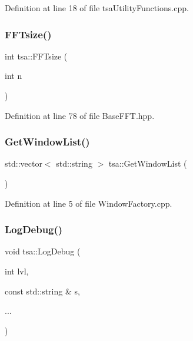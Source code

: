 Definition at line 18 of file tsa\+Utility\+Functions.\+cpp.

\mbox{\label{namespacetsa_ab56a65a614e542cef8536f461fc185a5}} 
\subsubsection{\texorpdfstring{F\+F\+Tsize()}{FFTsize()}}
{\footnotesize\ttfamily int tsa\+::\+F\+F\+Tsize (\begin{DoxyParamCaption}\item[{int}]{n }\end{DoxyParamCaption})\hspace{0.3cm}{\ttfamily [inline]}}



Definition at line 78 of file Base\+F\+F\+T.\+hpp.

\mbox{\label{namespacetsa_a98f39538beaf84d9f18635e0062f6b3e}} 
\subsubsection{\texorpdfstring{Get\+Window\+List()}{GetWindowList()}}
{\footnotesize\ttfamily std\+::vector$<$ std\+::string $>$ tsa\+::\+Get\+Window\+List (\begin{DoxyParamCaption}{ }\end{DoxyParamCaption})}



Definition at line 5 of file Window\+Factory.\+cpp.

\mbox{\label{namespacetsa_a2a922785b9b967a8e92ded5a1540688f}} 
\subsubsection{\texorpdfstring{Log\+Debug()}{LogDebug()}}
{\footnotesize\ttfamily void tsa\+::\+Log\+Debug (\begin{DoxyParamCaption}\item[{int}]{lvl,  }\item[{const std\+::string \&}]{s,  }\item[{}]{... }\end{DoxyParamCaption})}



